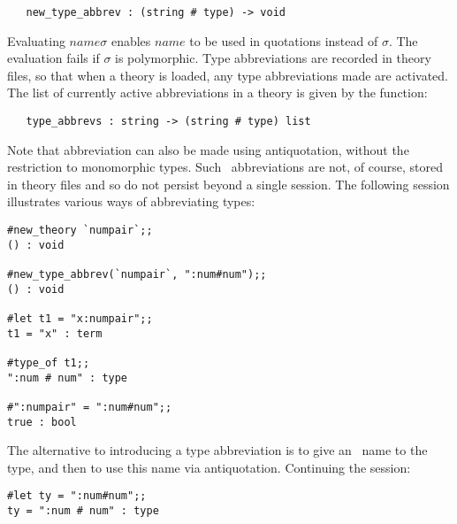 {{\begin{boxed}
\begin{verbatim}
   new_type_abbrev : (string # type) -> void 
\end{verbatim}\end{boxed}

\noindent Evaluating $name$$\sigma$
enables $name$ to be used in quotations instead of $\sigma$. The evaluation
fails
if $\sigma$ is polymorphic. Type abbreviations
are recorded in theory files, so that
when a theory is loaded, any type abbreviations made are
activated. The list of currently active abbreviations in a theory
is given by the function:

\begin{boxed}
\begin{verbatim}
   type_abbrevs : string -> (string # type) list
\end{verbatim}\end{boxed}


Note that abbreviation can also be made using antiquotation, without the
restriction to monomorphic types. Such \ML\ abbreviations are not, of course,
stored in theory files and so do not persist beyond a single session. 
The following session illustrates various ways of
abbreviating types:

\setcounter{sessioncount}{1}
\begin{session}\begin{verbatim}
#new_theory `numpair`;;
() : void

#new_type_abbrev(`numpair`, ":num#num");;
() : void

#let t1 = "x:numpair";;
t1 = "x" : term

#type_of t1;;
":num # num" : type

#":numpair" = ":num#num";;
true : bool
\end{verbatim}\end{session}

\noindent The alternative to introducing a type abbreviation is
to give an \ML\ name to the type, and then to use this name via antiquotation.
Continuing the session:

\begin{session}\begin{verbatim}
#let ty = ":num#num";;
ty = ":num # num" : type


\end{verbatim}
\end{session}}}
